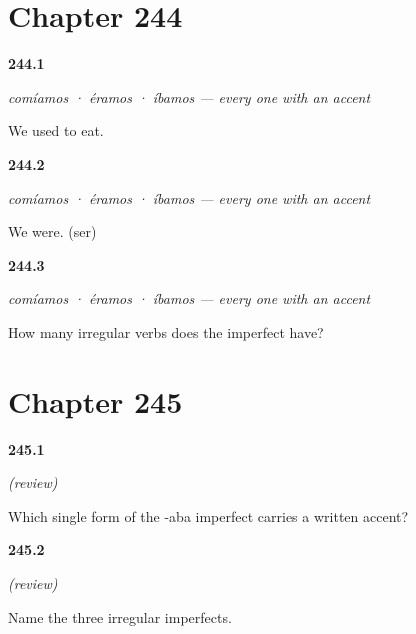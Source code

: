 \section*{Chapter 244}

\noindent\begin{minipage}[t]{\linewidth}
\raggedright
\hypertarget{review-ES-C63-comiamos-we}{\textbf{244.1}} \emph{comíamos · éramos · íbamos — every one with an accent}\par
\small We used to eat.
\end{minipage}\par\medskip

\noindent\begin{minipage}[t]{\linewidth}
\raggedright
\hypertarget{review-ES-C63-comiamos-ser}{\textbf{244.2}} \emph{comíamos · éramos · íbamos — every one with an accent}\par
\small We were. (ser)
\end{minipage}\par\medskip

\noindent\begin{minipage}[t]{\linewidth}
\raggedright
\hypertarget{review-ES-C63-comiamos-count}{\textbf{244.3}} \emph{comíamos · éramos · íbamos — every one with an accent}\par
\small How many irregular verbs does the imperfect have?
\end{minipage}\par\medskip

\section*{Chapter 245}

\noindent\begin{minipage}[t]{\linewidth}
\raggedright
\hypertarget{review-ES-C63-repaso-paradigmas-accent}{\textbf{245.1}} \emph{(review)}\par
\small Which single form of the -aba imperfect carries a written accent?
\end{minipage}\par\medskip

\noindent\begin{minipage}[t]{\linewidth}
\raggedright
\hypertarget{review-ES-C63-repaso-paradigmas-three}{\textbf{245.2}} \emph{(review)}\par
\small Name the three irregular imperfects.
\end{minipage}\par\medskip

